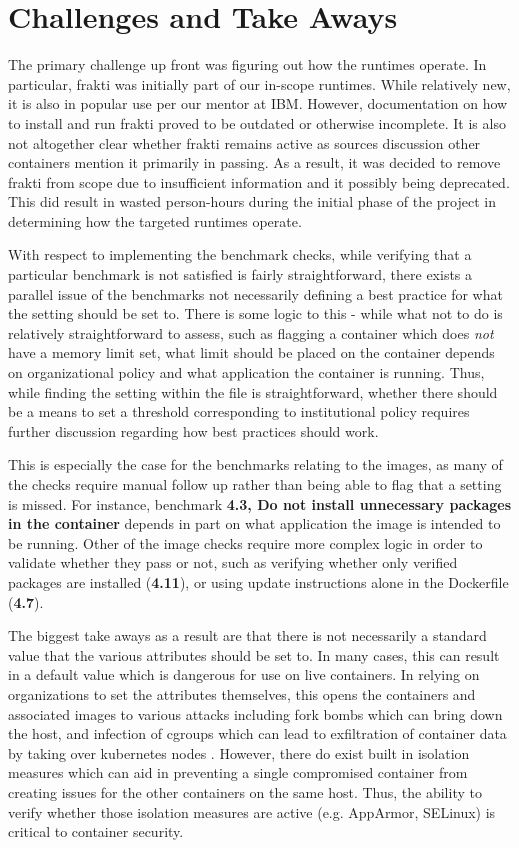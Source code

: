 \documentclass[times, twoside, watermark]{zHenriquesLab-StyleBioRxiv}
\begin{document}
\section*{Challenges and Take Aways}

The primary challenge up front was figuring out how the runtimes operate. In particular, frakti was initially part of our in-scope runtimes. While relatively new, it is also in popular use per our mentor at IBM. However, documentation on how to install and run frakti proved to be outdated or otherwise incomplete. It is also not altogether clear whether frakti remains active as sources discussion other containers mention it primarily in passing. As a result, it was decided to remove frakti from scope due to insufficient information and it possibly being deprecated. This did result in wasted person-hours during the initial phase of the project in determining how the targeted runtimes operate.

With respect to implementing the benchmark checks, while verifying that a particular benchmark is not satisfied is fairly straightforward, there exists a parallel issue of the benchmarks not necessarily defining a best practice for what the setting should be set to. There is some logic to this - while what not to do is relatively straightforward to assess, such as flagging a container which does \emph{not} have a memory limit set, what limit should be placed on the container depends on organizational policy and what application the container is running. Thus, while finding the setting within the file is straightforward, whether there should be a means to set a threshold corresponding to institutional policy requires further discussion regarding how best practices should work.

This is especially the case for the benchmarks relating to the images, as many of the checks require manual follow up rather than being able to flag that a setting is missed. For instance, benchmark \textbf{4.3, Do not install unnecessary packages in the container} depends in part on what application the image is intended to be running. Other of the image checks require more complex logic in order to validate whether they pass or not, such as verifying whether only verified packages are installed (\textbf{4.11}), or using update instructions alone in the Dockerfile (\textbf{4.7}). 

The biggest take aways as a result are that there is not necessarily a standard value that the various attributes should be set to. In many cases, this can result in a default value which is dangerous for use on live containers. In relying on organizations to set the attributes themselves, this opens the containers and associated images to various attacks including fork bombs which can bring down the host, and infection of cgroups which can lead to exfiltration of container data by taking over kubernetes nodes \cite{aqua_blog}. However, there do exist built in isolation measures which can aid in preventing a single compromised container from creating issues for the other containers on the same host. Thus, the ability to verify whether those isolation measures are active (e.g. AppArmor, SELinux) is critical to container security.
\end{document}
